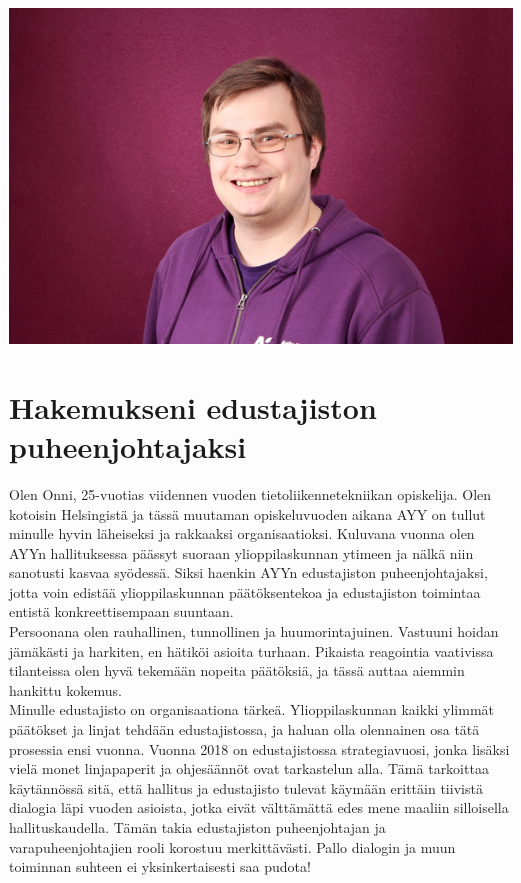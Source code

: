 \documentclass[a4paper, 12pt, finnish]{report}
\newcommand{\topic}{Hakemukseni edustajiston puheenjohtajaksi}
\begin{document}
\includegraphics{onnilampi_ayy.jpg}
\section*{\topic}

Olen Onni, 25-vuotias viidennen vuoden tietoliikennetekniikan opiskelija.
Olen kotoisin Helsingistä ja tässä muutaman opiskeluvuoden aikana AYY on tullut minulle hyvin läheiseksi ja rakkaaksi organisaatioksi.
Kuluvana vuonna olen AYYn hallituksessa päässyt suoraan ylioppilaskunnan ytimeen ja nälkä niin sanotusti kasvaa syödessä.
Siksi haenkin AYYn edustajiston puheenjohtajaksi, jotta voin edistää ylioppilaskunnan päätöksentekoa ja edustajiston toimintaa entistä konkreettisempaan suuntaan.\\

Persoonana olen rauhallinen, tunnollinen ja huumorintajuinen.
Vastuuni hoidan jämäkästi ja harkiten, en hätiköi asioita turhaan.
Pikaista reagointia vaativissa tilanteissa olen hyvä tekemään nopeita päätöksiä, ja tässä auttaa aiemmin hankittu kokemus.\\

Minulle edustajisto on organisaationa tärkeä.
Ylioppilaskunnan kaikki ylimmät päätökset ja linjat tehdään edustajistossa, ja haluan olla olennainen osa tätä prosessia ensi vuonna.
Vuonna 2018 on edustajistossa strategiavuosi, jonka lisäksi vielä monet linjapaperit ja ohjesäännöt ovat tarkastelun alla.
Tämä tarkoittaa käytännössä sitä, että hallitus ja edustajisto tulevat käymään erittäin tiivistä dialogia läpi vuoden asioista, jotka eivät välttämättä edes mene maaliin silloisella hallituskaudella.
Tämän takia edustajiston puheenjohtajan ja varapuheenjohtajien rooli korostuu merkittävästi. Pallo dialogin ja muun toiminnan suhteen ei yksinkertaisesti saa pudota!
 \\
\end{document}
